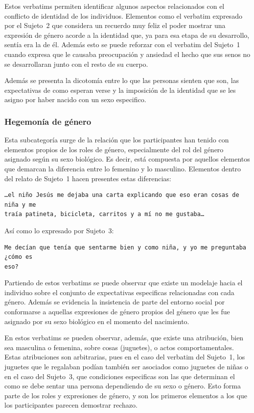 Estos verbatims permiten identificar algunos aspectos relacionados con el
conflicto de identidad de los individuos. Elementos como el verbatim expresado
por el Sujeto~2 que considera un recuerdo muy feliz el poder mostrar una
expresión de género acorde a la identidad que, ya para esa etapa de su
desarrollo, sentía era la de él. Además esto se puede reforzar con el verbatim
del Sujeto~1 cuando expresa que le causaba preocupación y ansiedad el hecho que
sus senos no se desarrollaran junto con el resto de su cuerpo.

Además se presenta la dicotomía entre lo que las personas sienten que son, las
expectativas de como esperan verse y la imposición de la identidad que se
les asigno por haber nacido con un sexo especifico.

\subsubsection{Hegemonía de género}

Esta subcategoría surge de la relación que los participantes han tenido con
elementos propios de los roles de género, especialmente del rol del género
asignado según su sexo biológico. Es decir, está compuesta por aquellos
elementos que demarcan la diferencia entre lo femenino y lo masculino. Elementos
dentro del relato de Sujeto~1 hacen presentes estas diferencias:

\begin{verbatim}
…el niño Jesús me dejaba una carta explicando que eso eran cosas de niña y me
traía patineta, bicicleta, carritos y a mí no me gustaba…
\end{verbatim}

Así como lo expresado por Sujeto~3:

\begin{verbatim}
Me decían que tenía que sentarme bien y como niña, y yo me preguntaba ¿cómo es
eso?
\end{verbatim}

Partiendo de estos verbatims se puede observar que existe un modelaje hacia el
individuo sobre el conjunto de expectativas especificas relacionadas con cada
género. Además se evidencia la insistencia de parte del entorno social por
conformarse a aquellas expresiones de género propios del género que les fue
asignado por su sexo biológico en el momento del nacimiento.

En estos verbatims se pueden observar, además, que existe una atribución, bien
sea masculina o femenina, sobre cosas (juguetes), o actos comportamentales.
Estas atribuciones son arbitrarias, pues en el caso del verbatim del Sujeto~1,
los juguetes que le regalaban podían también ser asociados como juguetes de
niñas o en el caso del Sujeto~3, que condiciones especificas son las que
determinan el como se debe sentar una persona dependiendo de su sexo o género.
Esto forma parte de los roles y expresiones de género, y son los primeros
elementos a los que los participantes parecen demostrar rechazo.

